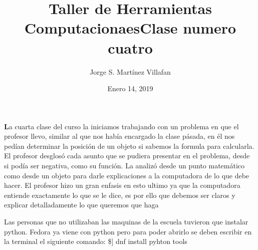 \documentclass[letterpaper, 12pt, oneside]{article}%
\title{\Huge Taller de Herramientas Computacionaes}
\author{Jorge S. Martínez Villafan}
\date{Enero 14, 2019}
\begin{document}
\maketitle
\newpage
\title{Clase numero cuatro}

\textbf La cuarta clase del curso la iniciamos trabajando con un problema en que el profesor llevo, similar al que nos había encargado la clase pásada, en él nos pedían determinar la posición de un objeto si sabemos la formula para calcularla. El profesor desglosó cada asunto que se pudiera presentar en el problema, desde si podía ser negativa, como su función. La analizó desde un punto matemático como desde un objeto para darle explicaciones a la computadora de lo que debe hacer. El profesor hizo un gran enfasis en esto ultimo ya que la computadora entiende exactamente lo que se le dice, es por ello que debemos ser claros y explicar detalladamente lo que queremos que haga

Las personas que no utilizaban las maquinas de la escuela tuvieron que instalar python. Fedora ya viene con python pero para poder abrirlo se deben escribir en la terminal el siguiente comando: \$] dnf install pyhton tools \\ 
\end{document}
